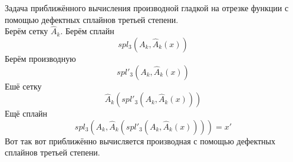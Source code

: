 \documentclass[__main__.tex]{subfiles}
\begin{document}
Задача приближённого вычисления производной гладкой на отрезке функции с помощью дефектных сплайнов третьей степени.\\

Берём сетку $\hat{A}_k$. Берём сплайн
$$
spl_3(A_k, \hat{A}_k(x))
$$
Берём производную
$$
spl'_3(A_k, \hat{A}_k(x))
$$
Ешё сетку 
$$
\hat{A}_k(spl'_3(A_k, \hat{A}_k(x)))
$$
Ещё сплайн
$$
spl_3(A_k, \hat{A}_k(spl'_3(A_k, \hat{A}_k(x)))) = x'
$$
Вот так вот приближённо вычисляется производная с помощью дефектных сплайнов третьей степени.
\end{document}
